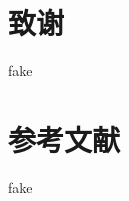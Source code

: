 \documentclass[master, macfonts]{njuthesis}
\author{李达}
\institute{南京大学}
\date{2021年x月xx日}
\begin{document}

\maketitle
\makeenglishtitle


\frontmatter





\tableofcontents

\listoffigures

\listoftables

\mainmatter









\chapter*{致谢}\label{acknowledgement}
fake
\chapter*{参考文献}\label{references}
fake
\nocite{*}

%
%
\end{document}
